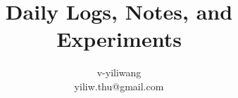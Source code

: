 \documentclass[10pt]{article}
\begin{document}
\title{Daily Logs, Notes, and Experiments}
\author{v-yiliwang \\
        yiliw.thu@gmail.com}
        
\maketitle
\renewcommand*\contentsname{{}}

\tableofcontents
\newpage

\newpage

\newpage


\newpage
{\small


}
\end{document}
